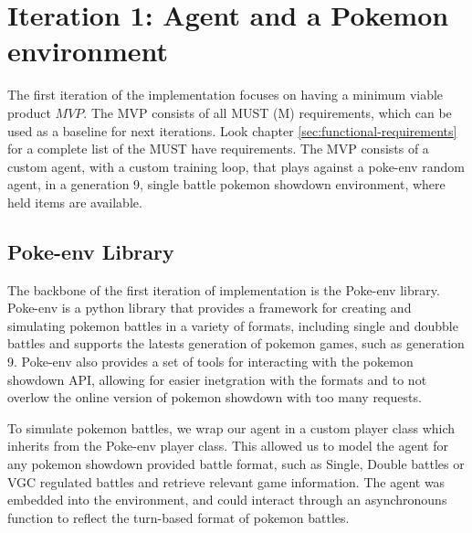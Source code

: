\section{Iteration 1: Agent and a Pokemon environment} 
\label{sec:Iteration-1-Agent-Environment}

The first iteration of the implementation focuses on having a minimum viable product \(MVP\). The MVP
consists of all MUST (M) requirements, which can be used as a baseline for next iterations.
Look chapter \ref{sec:functional-requirements} for a complete list of the MUST have requirements.
The MVP consists of a custom agent, with a custom training loop, that plays against a poke-env random agent,
in a generation 9, single battle pokemon showdown environment, where held items are available. 

\subsection{Poke-env Library}
The backbone of the first iteration of implementation is the Poke-env library. 
Poke-env is a python library that provides a framework for creating and simulating pokemon
battles in a variety of formats, including single and doubble battles and supports the latests
generation of pokemon games, such as generation 9. Poke-env also provides a set of tools
for interacting with the pokemon showdown API, allowing for easier inetgration with the formats
and to not overlow the online version of pokemon showdown with too many requests.

To simulate pokemon battles, we wrap our agent in a custom player class which inherits from the
Poke-env player class. This allowed us to model the agent for any pokemon showdown 
provided battle format, such as Single, Double battles or VGC regulated battles and 
retrieve relevant game information. The agent was embedded into the environment, and could 
interact through an asynchronouns function to reflect the turn-based format of pokemon battles.



